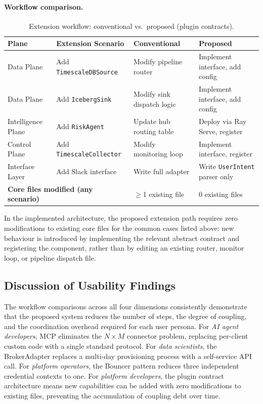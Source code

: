 \documentclass[12pt, a4paper]{report}
\begin{document}
\paragraph{Workflow comparison.}

\begin{table}[H]
  \centering
  \caption{Extension workflow: conventional vs.\ proposed (plugin contracts).}
  \label{tab:extensibility_results}
  \begin{tabularx}{\textwidth}{lXll}
    \toprule
    \textbf{Plane} &
    \textbf{Extension Scenario} &
    \textbf{Conventional} &
    \textbf{Proposed} \\
    \midrule
    Data Plane &
    Add \texttt{TimescaleDBSource} &
    Modify pipeline router &
    Implement interface, add config \\
    \addlinespace
    Data Plane &
    Add \texttt{IcebergSink} &
    Modify sink dispatch logic &
    Implement interface, add config \\
    \addlinespace
    Intelligence Plane &
    Add \texttt{RiskAgent} &
    Update hub routing table &
    Deploy via Ray Serve, register \\
    \addlinespace
    Control Plane &
    Add \texttt{TimescaleCollector} &
    Modify monitoring loop &
    Implement interface, register \\
    \addlinespace
    Interface Layer &
    Add Slack interface &
    Write full adapter &
    Write \texttt{UserIntent} parser only \\
    \midrule
    \multicolumn{2}{l}{\textbf{Core files modified (any scenario)}} &
    $\geq$1 existing file &
    0 existing files \\
    \bottomrule
  \end{tabularx}
\end{table}

In the implemented architecture, the proposed extension path requires zero
modifications to existing core files for the common cases listed above: new
behaviour is introduced by implementing the relevant abstract contract and
registering the component, rather than by editing an existing router, monitor
loop, or pipeline dispatch file.

\subsection{Discussion of Usability Findings}
\label{ssec:usability_discussion}

The workflow comparisons across all four dimensions consistently demonstrate that the
proposed system reduces the number of steps, the degree of coupling, and the
coordination overhead required for each user persona.
For \emph{AI agent developers}, MCP eliminates the $N \times M$ connector problem,
replacing per-client custom code with a single standard protocol.
For \emph{data scientists}, the BrokerAdapter replaces a multi-day provisioning
process with a self-service API call.
For \emph{platform operators}, the Bouncer pattern reduces three independent
credential contexts to one.
For \emph{platform developers}, the plugin contract architecture means new
capabilities can be added with zero modifications to existing files, preventing the
accumulation of coupling debt over time.
\end{document}
